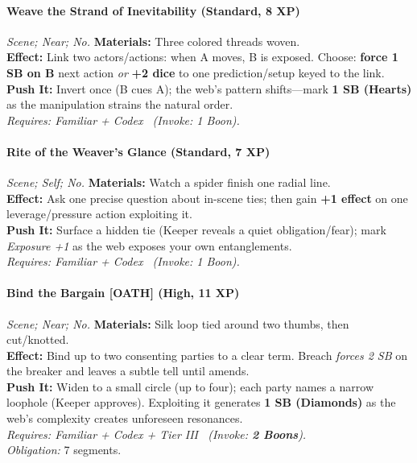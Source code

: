 \paragraph{Weave the Strand of Inevitability (Standard, 8 XP)} \emph{Scene; Near; No.}
\textbf{Materials:} Three colored threads woven.\\
\textbf{Effect:} Link two actors/actions: when A moves, B is exposed. Choose: \textbf{force 1 SB on B} next action \emph{or} \textbf{+2 dice} to one prediction/setup keyed to the link.\\
\textbf{Push It:} Invert once (B cues A); the web's pattern shifts—mark \textbf{1 SB (Hearts)} as the manipulation strains the natural order.\\
\emph{Requires: Familiar + Codex \ (\textit{Invoke:} 1 Boon).}

\paragraph{Rite of the Weaver's Glance (Standard, 7 XP)} \emph{Scene; Self; No.}
\textbf{Materials:} Watch a spider finish one radial line.\\
\textbf{Effect:} Ask one precise question about in-scene ties; then gain \textbf{+1 effect} on one leverage/pressure action exploiting it.\\
\textbf{Push It:} Surface a hidden tie (Keeper reveals a quiet obligation/fear); mark \emph{Exposure +1} as the web exposes your own entanglements.\\
\emph{Requires: Familiar + Codex \ (\textit{Invoke:} 1 Boon).}

\paragraph{Bind the Bargain \textnormal{[OATH]} (High, 11 XP)} \emph{Scene; Near; No.}
\textbf{Materials:} Silk loop tied around two thumbs, then cut/knotted.\\
\textbf{Effect:} Bind up to two consenting parties to a clear term. Breach \emph{forces 2 SB} on the breaker and leaves a subtle tell until amends.\\
\textbf{Push It:} Widen to a small circle (up to four); each party names a narrow loophole (Keeper approves). Exploiting it generates \textbf{1 SB (Diamonds)} as the web's complexity creates unforeseen resonances.\\
\emph{Requires: Familiar + Codex + Tier III \ (\textit{Invoke:} \textbf{2 Boons}).}\\
\emph{Obligation:} 7 segments.

